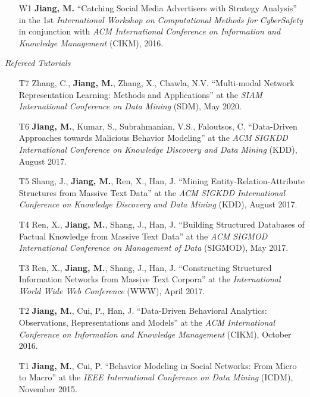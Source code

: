 \documentclass[10pt]{article}
\newenvironment{myindentpar}[1]%
{\begin{list}{}%
         {\setlength{\leftmargin}{#1}}%
         \item[]%
}
{\end{list}}
\newcounter{list}
\newcommand{\hide}[1]{}
\begin{document}
\begin{myindentpar}{0.00cm}
\begin{enumerate}[leftmargin=.5cm]
	\hide{\vspace{-0.1cm}\hspace{0.5cm}{\small \emph{I joined the discussion and edited the paper.}}}

\item[W1] \textbf{Jiang, M.} ``Catching Social Media Advertisers with Strategy Analysis'' in the 1st \textit{International Workshop on Computational Methods for CyberSafety} in conjunction with \textit{ACM International Conference on Information and Knowledge Management} (CIKM), 2016.

\end{enumerate}

\hspace{-0.25cm}\emph{Refereed Tutorials}

\begin{enumerate}[leftmargin=.5cm]

\item[T7] Zhang, C., \textbf{Jiang, M.}, Zhang, X., Chawla, N.V. ``Multi-modal Network Representation Learning: Methods and Applications'' at the \textit{SIAM International Conference on Data Mining} (SDM), May 2020.

\item[T6] \textbf{Jiang, M.}, Kumar, S., Subrahmanian, V.S., Faloutsos, C. ``Data-Driven Approaches towards Malicious Behavior Modeling'' at the \textit{ACM SIGKDD International Conference on Knowledge Discovery and Data Mining} (KDD), August 2017.

\item[T5] Shang, J., \textbf{Jiang, M.}, Ren, X., Han, J. ``Mining Entity-Relation-Attribute Structures from Massive Text Data'' at the \textit{ACM SIGKDD International Conference on Knowledge Discovery and Data Mining} (KDD), August 2017.

\item[T4] Ren, X., \textbf{Jiang, M.}, Shang, J., Han, J. ``Building Structured Databases of Factual Knowledge from Massive Text Data'' at the \textit{ACM SIGMOD International Conference on Management of Data} (SIGMOD), May 2017.
		
\item[T3] Ren, X., \textbf{Jiang, M.}, Shang, J., Han, J. ``Constructing Structured Information Networks from Massive Text Corpora'' at the \textit{International World Wide Web Conference}  (WWW), April 2017.

\item[T2] \textbf{Jiang, M.}, Cui, P., Han, J. ``Data-Driven Behavioral Analytics: Observations, Representations and Models'' at the \textit{ACM International Conference on Information and Knowledge Management} (CIKM), October 2016.
		
\item[T1] \textbf{Jiang, M.}, Cui, P. ``Behavior Modeling in Social Networks: From Micro to Macro'' at the \textit{IEEE International Conference on Data Mining} (ICDM), November 2015.

\end{enumerate}

\end{myindentpar}
\end{document}
